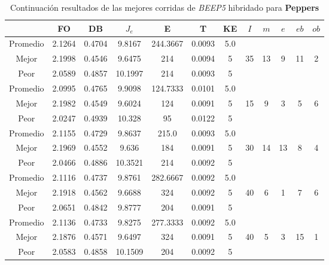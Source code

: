 \begin{table}[h!]
    \footnotesize
    \begin{center}
        \begin{tabular}{|c|c|c|c|c|c|c|c|c|c|c|c|}
        \hline
             & {\bf FO} & {\bf DB} & $J_e$ & {\bf E} & {\bf T} & {\bf KE} & $I$ & $m$ & $e$ & $eb$ & $ob$ \\
        \hline
        \hline
            Promedio  & 2.1264 & 0.4704 & 9.8167 & 244.3667 & 0.0093 & 5.0 &  &  &  &  & \\
            \cline{1-7}
            Mejor & 2.1998 & 0.4546  & 9.6475 & 214 & 0.0094 & 5 & 35 & 13 & 9 & 11 & 2\\
            \cline{1-7}
            Peor & 2.0589 & 0.4857  & 10.1997 & 214 & 0.0093 & 5 &  &  &  &  & \\
        \hline
        \hline
            Promedio  & 2.0995 & 0.4765 & 9.9098 & 124.7333 & 0.0101 & 5.0 &  &  &  &  & \\
            \cline{1-7}
            Mejor & 2.1982 & 0.4549  & 9.6024 & 124 & 0.0091 & 5 & 15 & 9 & 3 & 5 & 6\\
            \cline{1-7}
            Peor & 2.0247 & 0.4939  & 10.328 & 95 & 0.0122 & 5 &  &  &  &  & \\
        \hline
        \hline
            Promedio  & 2.1155 & 0.4729 & 9.8637 & 215.0 & 0.0093 & 5.0 &  &  &  &  & \\
            \cline{1-7}
            Mejor & 2.1969 & 0.4552  & 9.636 & 184 & 0.0091 & 5 & 30 & 14 & 13 & 8 & 4\\
            \cline{1-7}
            Peor & 2.0466 & 0.4886  & 10.3521 & 214 & 0.0092 & 5 &  &  &  &  & \\
        \hline
        \hline
            Promedio  & 2.1116 & 0.4737 & 9.8761 & 282.6667 & 0.0092 & 5.0 &  &  &  &  & \\
            \cline{1-7}
            Mejor & 2.1918 & 0.4562  & 9.6688 & 324 & 0.0092 & 5 & 40 & 6 & 1 & 7 & 6\\
            \cline{1-7}
            Peor & 2.0651 & 0.4842  & 9.8777 & 204 & 0.0091 & 5 &  &  &  &  & \\
        \hline
        \hline
            Promedio  & 2.1136 & 0.4733 & 9.8275 & 277.3333 & 0.0092 & 5.0 &  &  &  &  & \\
            \cline{1-7}
            Mejor & 2.1876 & 0.4571  & 9.6497 & 324 & 0.0091 & 5 & 40 & 5 & 3 & 15 & 1\\
            \cline{1-7}
            Peor & 2.0583 & 0.4858  & 10.1509 & 204 & 0.0092 & 5 &  &  &  &  & \\
        \hline
        \end{tabular}
        \caption{Continuaci\'on resultados de las mejores corridas de \emph{BEEP5} hibridado para {\bf Peppers}}
        \label{tb:ctableBEEP5}
    \end{center}
\end{table}
